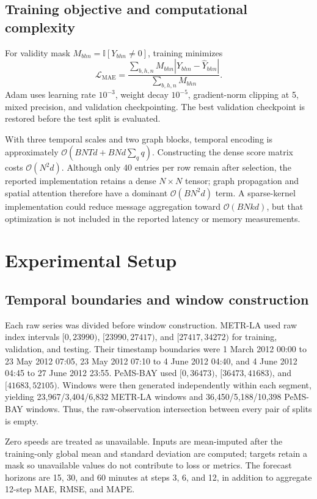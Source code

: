 \documentclass[fleqn,10pt]{wlscirep}
\newenvironment{changedcontent}{\color{changeblue}}{}
\begin{document}
\begin{changedcontent}
\subsection{Training objective and computational complexity}
For validity mask $M_{bhn}=\mathbb{I}[Y_{bhn}\neq0]$, training minimizes
\begin{equation}
\mathcal{L}_{\mathrm{MAE}}=
\frac{\sum_{b,h,n}M_{bhn}\left|Y_{bhn}-\widehat{Y}_{bhn}\right|}
{\sum_{b,h,n}M_{bhn}}.
\label{eq:training_loss}
\end{equation}
Adam uses learning rate $10^{-3}$, weight decay $10^{-5}$, gradient-norm
clipping at 5, mixed precision, and validation checkpointing. The best
validation checkpoint is restored before the test split is evaluated.

With three temporal scales and two graph blocks, temporal encoding is
approximately $\mathcal{O}(BNTd+BNd\sum_q q)$. Constructing the dense score
matrix costs $\mathcal{O}(N^2d)$. Although only 40 entries per row remain
after selection, the reported implementation retains a dense $N\times N$
tensor; graph propagation and spatial attention therefore have a dominant
$\mathcal{O}(BN^2d)$ term. A sparse-kernel implementation could reduce message
aggregation toward $\mathcal{O}(BNkd)$, but that optimization is not included
in the reported latency or memory measurements.
\end{changedcontent}

\section{Experimental Setup}
\label{sec:setup}
\subsection{Temporal boundaries and window construction}
Each raw series was divided before window construction. METR-LA used raw index
intervals $[0,23990)$, $[23990,27417)$, and $[27417,34272)$ for training,
validation, and testing. Their timestamp boundaries were 1 March 2012 00:00 to
23 May 2012 07:05, 23 May 2012 07:10 to 4 June 2012 04:40, and 4 June 2012
04:45 to 27 June 2012 23:55. PeMS-BAY used $[0,36473)$, $[36473,41683)$, and
$[41683,52105)$. Windows were then generated independently within each segment,
yielding 23,967/3,404/6,832 METR-LA windows and
36,450/5,188/10,398 PeMS-BAY windows. Thus, the raw-observation intersection
between every pair of splits is empty.

Zero speeds are treated as unavailable. Inputs are mean-imputed after the
training-only global mean and standard deviation are computed; targets retain a
mask so unavailable values do not contribute to loss or metrics. The forecast
horizons are 15, 30, and 60 minutes at steps 3, 6, and 12, in addition to
aggregate 12-step MAE, RMSE, and MAPE.
\end{document}
